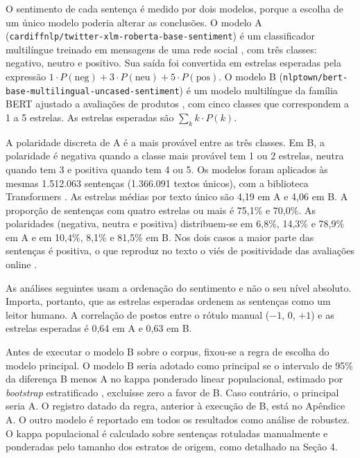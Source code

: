 O sentimento de cada sentença é medido por dois modelos, porque a escolha de um único modelo poderia alterar as conclusões. O modelo A (\texttt{cardiffnlp/\allowbreak twitter-\allowbreak xlm-\allowbreak roberta-\allowbreak base-\allowbreak sentiment}) é um classificador multilíngue treinado em mensagens de uma rede social \citep{barbieri2022,hf_cardiffnlp}, com três classes: negativo, neutro e positivo. Sua saída foi convertida em estrelas esperadas pela expressão $1 \cdot P(\text{neg}) + 3 \cdot P(\text{neu}) + 5 \cdot P(\text{pos})$. O modelo B (\texttt{nlptown/\allowbreak bert-\allowbreak base-\allowbreak multilingual-\allowbreak uncased-\allowbreak sentiment}) é um modelo multilíngue da família BERT \citep{devlin2019} ajustado a avaliações de produtos \citep{hf_nlptown}, com cinco classes que correspondem a 1 a 5 estrelas. As estrelas esperadas são $\sum_k k \cdot P(k)$.

A polaridade discreta de A é a mais provável entre as três classes. Em B, a polaridade é negativa quando a classe mais provável tem 1 ou 2 estrelas, neutra quando tem 3 e positiva quando tem 4 ou 5. Os modelos foram aplicados às mesmas 1.512.063 sentenças (1.366.091 textos únicos), com a biblioteca Transformers \citep{wolf2020}. As estrelas médias por texto único são 4,19 em A e 4,06 em B. A proporção de sentenças com quatro estrelas ou mais é 75,1\% e 70,0\%. As polaridades (negativa, neutra e positiva) distribuem-se em 6,8\%, 14,3\% e 78,9\% em A e em 10,4\%, 8,1\% e 81,5\% em B. Nos dois casos a maior parte das sentenças é positiva, o que reproduz no texto o viés de positividade das avaliações online \citep{zervas2021,bridges2016}.

As análises seguintes usam a ordenação do sentimento e não o seu nível absoluto. Importa, portanto, que as estrelas esperadas ordenem as sentenças como um leitor humano. A correlação de postos entre o rótulo manual ($-1$, 0, $+1$) e as estrelas esperadas é 0,64 em A e 0,63 em B.

Antes de executar o modelo B sobre o corpus, fixou-se a regra de escolha do modelo principal. O modelo B seria adotado como principal se o intervalo de 95\% da diferença B menos A no kappa ponderado linear populacional, estimado por \textit{bootstrap} estratificado \citep{efron1979}, excluísse zero a favor de B. Caso contrário, o principal seria A. O registro datado da regra, anterior à execução de B, está no Apêndice A. O outro modelo é reportado em todos os resultados como análise de robustez. O kappa populacional é calculado sobre sentenças rotuladas manualmente e ponderadas pelo tamanho dos estratos de origem, como detalhado na Seção 4.


